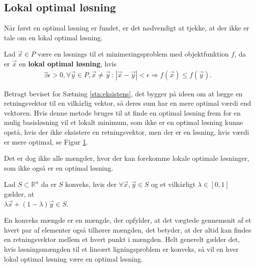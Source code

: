 \subsection{Lokal optimal løsning}
Når først en optimal løsning er fundet, er det nødvendigt at tjekke, at der ikke er tale om en lokal optimal løsning.
\begin{defn}
Lad $\vec{x} \in P$ være en løsnings til et minimeringsproblem med objektfunktion $f$, da er $\vec{x}$ en \textbf{lokal optimal løsning}, hvis 
\begin{align*}
\exists \epsilon > 0, \forall \vec{y} \in P, \vec{x}\neq \vec{y} \, : \, |\vec{x}-\vec{y}| < \epsilon \Rightarrow f(\vec{x})\leq f(\vec{y}).
\end{align*}
\end{defn}
Betragt beviset for Sætning \ref{stn:eksistens}, det bygger på ideen om at lægge en retningsvektor til en vilkårlig vektor, så deres sum har en mere optimal værdi end vektoren. 
Hvis denne metode bruges til at finde en optimal løsning frem for en mulig basisløsning vil et lokalt minimum, som ikke er en optimal løsning kunne opstå, hvis der ikke eksistere en retningsvektor, men der er en løsning, hvis værdi er mere optimal, se Figur \ref{fig:lokaltmin}.
\begin{figure}
\begin{center}
	
	\label{fig:lokaltmin}
\end{center}
\end{figure}
Det er dog ikke alle mængder, hvor der kan forekomme lokale optimale løsninger, som ikke også er en optimal løsning.
\begin{defn} 
Lad $S \subset \mathds{R}^n$  da er $S$ konveks, hvis der $\forall \vec{x}, \vec{y} \in S$ og et vilkårligt $\lambda \in [0,1]$ gælder, at \\ 
$\lambda \vec{x} + (1-\lambda) \vec{y} \in S$.
\label{def:Konveks}
\end{defn}
En konveks mængde er en mængde, der opfylder, at det vægtede gennemsnit af et hvert par af elementer også tilhører mængden, det betyder, at der altid kan findes en retningsvektor mellem et hvert punkt i mængden.
Helt generelt gælder det, hvis løsningsmængden til et lineært ligningsproblem er konveks, så vil en hver lokal optimal løsning være en optimal løsning.

